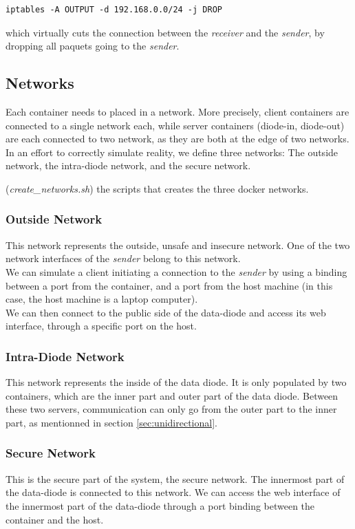 \documentclass[a4paper,11pt]{article}
\begin{document}
\begin{lstlisting}[frame=single] 
iptables -A OUTPUT -d 192.168.0.0/24 -j DROP
\end{lstlisting}

which virtually cuts the connection between the \textit{receiver} and the \textit{sender}, by dropping all paquets going to the \textit{sender}.


\subsection{Networks}
Each container needs to placed in a network. More precisely, client containers are connected to a single network each, while server containers (diode-in, diode-out) are each connected to two network, as they are both at the edge of two networks.\\

In an effort to correctly simulate reality, we define three networks: The outside network, the intra-diode network, and the secure network.

\begin{table}

\caption{(\textit{create\_networks.sh}) the scripts that creates the three docker networks.}
\end{table}

\subsubsection{Outside Network}
This network represents the outside, unsafe and insecure network. One of the two network interfaces of the \textit{sender} belong to this network.\\

We can simulate a client initiating a connection to the \textit{sender} by using a binding between a port from the container, and a port from the host machine (in this case, the host machine is a laptop computer).\\

We can then connect to the public side of the data-diode and access its web interface, through a specific port on the host.

\subsubsection{Intra-Diode Network}
This network represents the inside of the data diode. It is only populated by two containers, which are the inner part and outer part of the data diode. Between these two servers, communication can only go from the outer part to the inner part, as mentionned in section \ref{sec:unidirectional}.\\

\subsubsection{Secure Network}
This is the secure part of the system, the secure network. The innermost part of the data-diode is connected to this network. We can access the web interface of the innermost part of the data-diode through a port binding between the container and the host.
\end{document}
